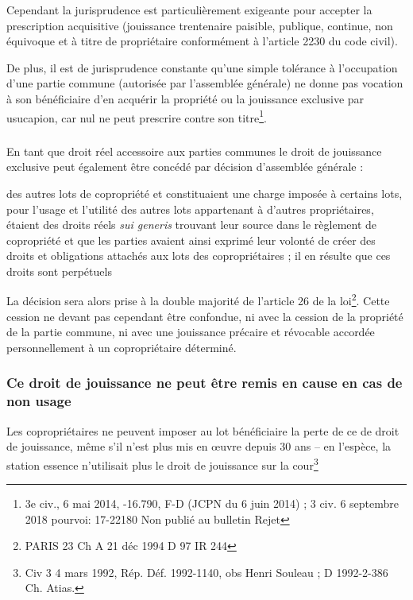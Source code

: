 			Cependant la jurisprudence est particulièrement exigeante pour accepter la prescription acquisitive
			(jouissance trentenaire paisible, publique, continue, non équivoque et à titre de propriétaire
			conformément à l’article 2230 du code civil).
			
			De plus, il est de jurisprudence constante qu’une simple tolérance à l’occupation d’une partie commune
			(autorisée par l’assemblée générale) ne donne pas vocation à son bénéficiaire d’en acquérir la propriété
			ou la jouissance exclusive par usucapion, car nul ne peut prescrire contre son titre\footnote{3e civ., 6 mai 2014, -16.790, F-D (JCPN du 6 juin 2014) ; 3\degre{} civ. 6 septembre 2018 \no pourvoi: 17-22180 Non publié au bulletin Rejet}.
		
		\subsubsection{}
		
			En tant que droit réel accessoire aux parties communes le droit de jouissance exclusive peut également être concédé par décision d’assemblée générale :
			
			des autres lots de copropriété et constituaient une charge imposée à certains lots, pour l'usage et l'utilité des autres lots
			appartenant à d'autres propriétaires, étaient des droits réels \emph{sui generis} trouvant leur source dans le règlement de
			copropriété et que les parties avaient ainsi exprimé leur volonté de créer des droits et obligations attachés aux lots des
			copropriétaires ; il en résulte que ces droits sont perpétuels
		
			La décision sera alors prise à la double majorité de l’article 26 de la loi\footnote{PARIS 23\degre{} Ch A 21 déc 1994 D 97 IR 244}. Cette cession ne devant pas	cependant être confondue, ni avec la cession de la propriété de la partie commune, ni avec une jouissance	précaire et révocable accordée personnellement à un copropriétaire déterminé.
		
		\subsubsection{Ce droit de jouissance ne peut être remis en cause en cas de non usage}
		
			Les copropriétaires ne peuvent imposer au lot bénéficiaire la perte de ce de droit de jouissance, même
			s’il n’est plus mis en œuvre depuis 30 ans – en l’espèce, la station essence n’utilisait plus le droit de
			jouissance sur la cour\footnote{Civ 3\degre{} 4 mars 1992, Rép. Déf. 1992-1140, obs Henri Souleau ; D 1992-2-386 Ch. Atias.}
	
